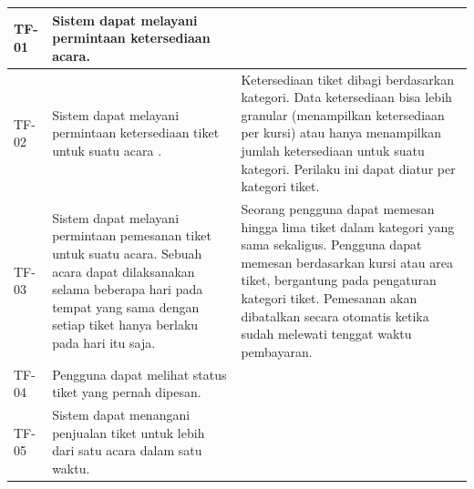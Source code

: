 \begin{longtable}{|l|p{}|p{}|}
    \hline
    \endlastfoot

    \hline
    TF-01       & Sistem dapat melayani permintaan ketersediaan acara.                                                                                                                                                 &                                                                                                                                                                                                                                                                                     \\
    \hline
    TF-02       & Sistem dapat melayani permintaan ketersediaan tiket untuk suatu acara .                                                                                                                              & Ketersediaan tiket dibagi berdasarkan kategori. Data ketersediaan bisa lebih granular (menampilkan ketersediaan per kursi) atau hanya menampilkan jumlah ketersediaan untuk suatu kategori. Perilaku ini dapat diatur per kategori tiket.                                           \\
    \hline
    TF-03       & Sistem dapat melayani permintaan pemesanan tiket untuk suatu acara. Sebuah acara dapat dilaksanakan selama beberapa hari pada tempat yang sama dengan setiap tiket hanya berlaku pada hari itu saja. & Seorang pengguna dapat memesan hingga lima tiket dalam kategori yang sama sekaligus. Pengguna dapat memesan berdasarkan kursi atau area tiket, bergantung pada pengaturan kategori tiket. Pemesanan akan dibatalkan secara otomatis ketika sudah melewati tenggat waktu pembayaran. \\
    \hline
    TF-04       & Pengguna dapat melihat status tiket yang pernah dipesan.                                                                                                                                             &                                                                                                                                                                                                                                                                                     \\
    \hline
    TF-05       & Sistem dapat menangani penjualan tiket untuk lebih dari satu acara dalam satu waktu.                                                                                                                 &                                                                                                                                                                                                                                                                                     \\
\end{longtable}
\endgroup

